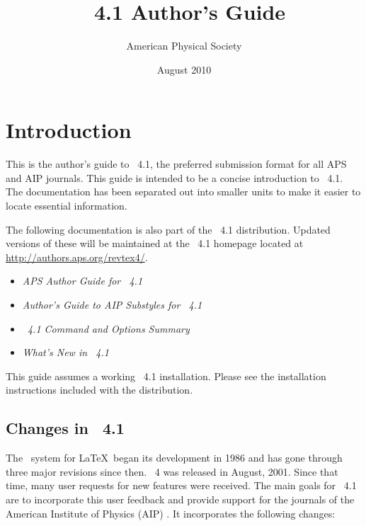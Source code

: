 \documentclass[%
,aps%
 ,twocolumn%
 ,secnumarabic%
,amssymb, amsmath,nobibnotes, aps, prl, floatfix]{revtex4-1}
\begin{document}
\title{\revtex~4.1 Author's Guide}%
\author{American Physical Society}%
\date{August 2010}%
\maketitle
\tableofcontents
\clearpage
\section{Introduction}

This is the author's guide to \revtex~4.1, the preferred submission
format for all APS and AIP journals. This guide is intended to be a concise
introduction to \revtex~4.1. The documentation has been separated out
into smaller units to make it easier to locate essential
information.

The following documentation is also part of the \revtex~4.1
distribution. Updated versions of these will be maintained at
the \revtex~4.1 homepage located at \url{http://authors.aps.org/revtex4/}.
\begin{itemize}
\item \textit{APS Author Guide for \revtex~4.1}
\item \textit{Author's Guide to AIP Substyles for \revtex~4.1}
\item \textit{\revtex~4.1 Command and Options Summary}
\item \textit{What's New in  \revtex~4.1}
\end{itemize}
This guide assumes a working \revtex~4.1
installation. Please see the installation instructions included with the
distribution.
\subsection{Changes in \revtex~4.1}
The \revtex\ system for \LaTeX\ began its development in 1986 and has
gone through three major revisions since then.  \revtex~4 was released in August, 2001. Since that time,
many user requests for new features were received. The main goals for  \revtex~4.1 are to incorporate
this user feedback and provide support for the journals of the American Institute of Physics (AIP) . It incorporates the following changes:
\end{document}
